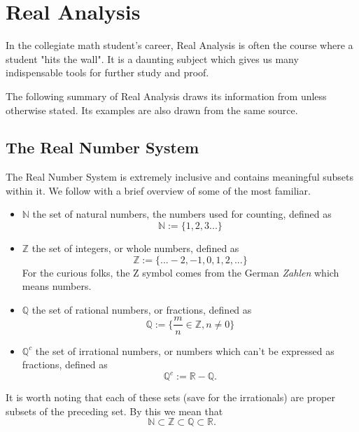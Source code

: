 \section{Real Analysis}%
In the collegiate math student's career, Real Analysis is often the course where a student "hits the wall". It is a daunting subject which gives us many indispensable tools for further study and proof.\newline

 The following summary of Real Analysis draws its information from\cite{IntroAnalysis} unless otherwise stated. Its examples are also drawn from the same source.

\subsection{The Real Number System}

The Real Number System is extremely inclusive and contains meaningful subsets within it. We follow with a brief overview of some of the most familiar.\newline
\begin{itemize}
\item $\mathbb{N}$ the set of natural numbers, the numbers used for counting, defined as $$\mathbb{N} :=\{1,2,3...\}$$
\item $\mathbb{Z}$ the set of integers, or whole numbers, defined as $$\mathbb{Z} :=\{...-2,-1,0,1,2,...\}$$ For the curious folks, the Z symbol comes from the German \emph{Zahlen} which means numbers.
\item $\mathbb{Q}$ the set of rational numbers, or fractions, defined as $$\mathbb{Q} := \{\frac{m}{n}\in \mathbb{Z}, n\neq 0\}$$
\item $\mathbb{Q}^c$ the set of irrational numbers, or numbers which can't be expressed as fractions, defined as $$\mathbb{Q}^c := \mathbb{R}-\mathbb{Q}.$$
\end{itemize}
It is worth noting that each of these sets (save for the irrationals) are proper subsets of the preceding set. By this we mean that $$\mathbb{N} \subset \mathbb{Z} \subset \mathbb{Q} \subset \mathbb{R}.$$

